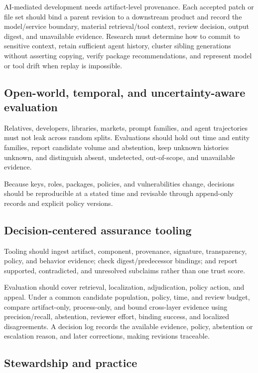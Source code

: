 AI-mediated development needs artifact-level provenance. Each accepted patch or file set should bind a parent revision to a downstream product and record the model/service boundary, material retrieval/tool context, review decision, output digest, and unavailable evidence. Research must determine how to commit to sensitive context, retain sufficient agent history, cluster sibling generations without asserting copying, verify package recommendations, and represent model or tool drift when replay is impossible.

\subsection{Open-world, temporal, and uncertainty-aware evaluation}

Relatives, developers, libraries, markets, prompt families, and agent trajectories must not leak across random splits. Evaluations should hold out time and entity families, report candidate volume and abstention, keep unknown histories unknown, and distinguish absent, undetected, out-of-scope, and unavailable evidence.

Because keys, roles, packages, policies, and vulnerabilities change, decisions should be reproducible at a stated time and revisable through append-only records and explicit policy versions.

\subsection{Decision-centered assurance tooling}

Tooling should ingest artifact, component, provenance, signature, transparency, policy, and behavior evidence; check digest/predecessor bindings; and report supported, contradicted, and unresolved subclaims rather than one trust score.

Evaluation should cover retrieval, localization, adjudication, policy action, and appeal. Under a common candidate population, policy, time, and review budget, compare artifact-only, process-only, and bound cross-layer evidence using precision/recall, abstention, reviewer effort, binding success, and localized disagreements. A decision log records the available evidence, policy, abstention or escalation reason, and later corrections, making revisions traceable.

\subsection{Stewardship and practice}

